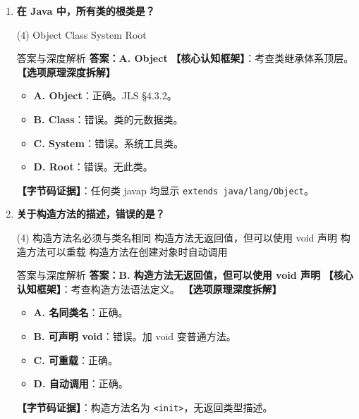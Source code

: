 ﻿\documentclass[12pt, a4paper]{ctexart}
\newcommand{\code}[1]{\texttt{#1}}
\begin{document}
\begin{enumerate}[label=\textbf{\arabic*.}, itemsep=1em]
	\item \textbf{在 Java 中，所有类的根类是？}
	      \begin{tasks}(4)
		      \task Object \task Class \task System \task Root
	      \end{tasks}
	      \begin{bluebox}{答案与深度解析}
		      \textbf{答案：A. Object}
		      \textbf{【核心认知框架】}：考查类继承体系顶层。
		      \textbf{【选项原理深度拆解】}
		      \begin{itemize}[leftmargin=*, nosep]
			      \item \textbf{A. Object}：正确。JLS §4.3.2。
			      \item \textbf{B. Class}：错误。类的元数据类。
			      \item \textbf{C. System}：错误。系统工具类。
			      \item \textbf{D. Root}：错误。无此类。
		      \end{itemize}
		      \textbf{【字节码证据】}：任何类 javap 均显示 \code{extends java/lang/Object}。
	      \end{bluebox}

	\item \textbf{关于构造方法的描述，错误的是？}
	      \begin{tasks}(4)
		      \task 构造方法名必须与类名相同
		      \task 构造方法无返回值，但可以使用 void 声明
		      \task 构造方法可以重载
		      \task 构造方法在创建对象时自动调用
	      \end{tasks}
	      \begin{bluebox}{答案与深度解析}
		      \textbf{答案：B. 构造方法无返回值，但可以使用 void 声明}
		      \textbf{【核心认知框架】}：考查构造方法语法定义。
		      \textbf{【选项原理深度拆解】}
		      \begin{itemize}[leftmargin=*, nosep]
			      \item \textbf{A. 名同类名}：正确。
			      \item \textbf{B. 可声明 void}：错误。加 void 变普通方法。
			      \item \textbf{C. 可重载}：正确。
			      \item \textbf{D. 自动调用}：正确。
		      \end{itemize}
		      \textbf{【字节码证据】}：构造方法名为 \code{<init>}，无返回类型描述。
	      \end{bluebox}


\end{enumerate}
\end{document}
